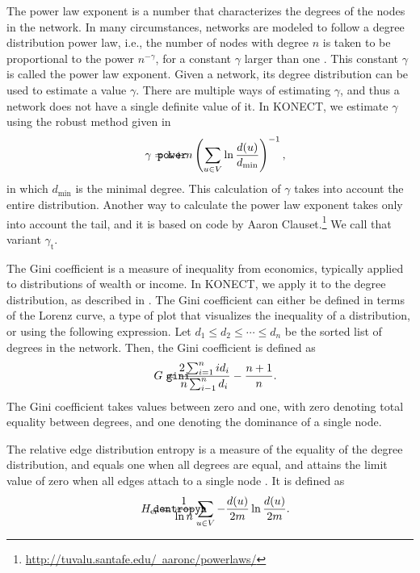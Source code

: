 \documentclass{article}
\def\mathnote#1{%
  \tag*{\rlap{\hspace\marginparsep\smash{\parbox[t]{\marginparwidth}{#1}}}}
}
\begin{document}
The power law exponent is a number that characterizes the degrees of the
nodes in the network.  In many circumstances, networks are modeled to
follow a degree distribution power law, i.e., the number of nodes with
degree $n$ is taken to be proportional to the power $n^{-\gamma}$, for a
constant $\gamma$ larger than one \citep{b439}.  This constant $\gamma$
is called the power law exponent.  Given a network, its degree
distribution can be used to estimate a value $\gamma$.  There are
multiple ways of estimating $\gamma$, and thus a network does not have a
single definite value of it. In KONECT, we estimate $\gamma$ using the
robust method given in \citep[Eq.~5]{b408}
\begin{align}
  \mathnote{\texttt{power}} \gamma &= 1 + n \left( \sum_{u\in V} \ln
  \frac {d(u)} {d_{\min}} \right) ^{-1},
\end{align}
in which $d_{\min}$ is the minimal degree.  This calculation of $\gamma$
takes into account the entire distribution.   Another way to calculate
the power law exponent takes only into account the tail, and it is based
on code by Aaron Clauset.\footnote{\href{http://tuvalu.santafe.edu/~aaronc/powerlaws/}{http://tuvalu.santafe.edu/~aaronc/powerlaws/}}  We call that
variant $\gamma_{\mathrm t}$. 

The Gini coefficient is a measure of inequality from economics,
typically applied to distributions of wealth or income.  In KONECT, we
apply it to the degree distribution, as described in
\citep{kunegis:power-law}.  The Gini coefficient can either be defined in
terms of the Lorenz curve, a type of plot that visualizes the inequality
of a distribution, or using the following expression.  Let $d_1 \leq d_2
\leq \dotsb \leq d_{n}$ be the sorted list of degrees in the
network. Then, the Gini coefficient is defined as
\begin{align}
  \mathnote{\texttt{gini}} G &= \frac {2 \sum_{i=1}^{n} i d_i} {n
    \sum_{i-1}^{n} d_i} - \frac {n+1} {n}.
\end{align}
The Gini coefficient takes values between zero and one, with zero
denoting total equality between degrees, and one denoting the dominance
of a single node.

The relative edge distribution entropy is a measure of the equality of
the degree distribution, and equals one when all degrees are equal, and
attains the limit value of zero when all edges attach to a single node
\citep{kunegis:power-law}.  It is defined as
\begin{align}
  \mathnote{\texttt{dentropyn}} H_{\mathrm{er}} &= \frac 1 {\ln n}
  \sum_{u \in V} - \frac{d(u)}{2m} \ln \frac{d(u)}{2m}.
\end{align}
\end{document}
